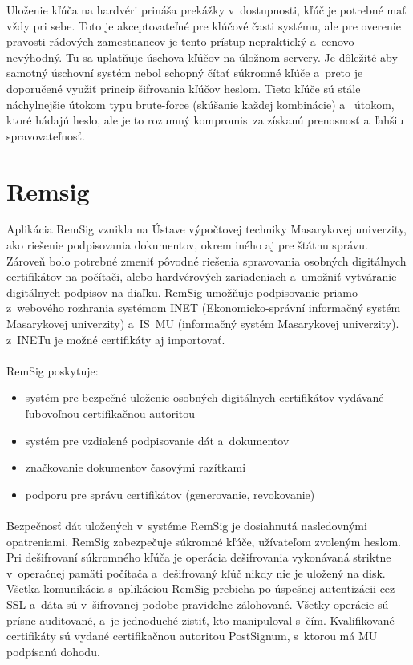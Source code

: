 \documentclass[
  digital, %
  table,   %
oneside,
  nolof,     %
  nolot,     %
]{fithesis3}
\begin{document}
Uloženie kľúča na hardvéri prináša prekážky v~dostupnosti, kľúč je potrebné mať vždy pri sebe. Toto je akceptovateľné pre kľúčové časti systému, ale pre overenie pravosti rádových zamestnancov je tento prístup nepraktický a~cenovo nevýhodný. Tu sa uplatňuje úschova kľúčov na úložnom servery. Je dôležité aby samotný úschovní systém nebol schopný čítať súkromné kľúče a~preto je doporučené využiť princíp šifrovania kľúčov heslom. Tieto kľúče sú stále náchylnejšie útokom typu brute-force (skúšanie každej kombinácie) a~ útokom, ktoré hádajú heslo, ale je to rozumný kompromis~za získanú prenosnosť a~ľahšiu spravovateľnosť.
 
\section{Remsig}
Aplikácia RemSig \cite{remsigMuni} vznikla na Ústave výpočtovej techniky Masarykovej univerzity, ako riešenie podpisovania dokumentov, okrem iného aj pre štátnu správu. Zároveň bolo potrebné zmeniť pôvodné riešenia spravovania osobných digitálnych certifikátov na počítači, alebo hardvérových zariadeniach a~umožniť vytváranie digitálnych podpisov na diaľku. RemSig umožňuje podpisovanie priamo z~webového rozhrania systémom INET (Ekonomicko-správní informačný systém Masarykovej univerzity) a~IS~MU (informačný systém Masarykovej univerzity). z~INETu je možné certifikáty aj importovať.\paragraph{}
RemSig poskytuje:
\begin{itemize}
\item systém pre bezpečné uloženie osobných digitálnych certifikátov vydávané ľubovoľnou certifikačnou autoritou
\item systém pre vzdialené podpisovanie dát a~dokumentov
\item značkovanie dokumentov časovými razítkami 
\item podporu pre správu certifikátov (generovanie, revokovanie)

 \end{itemize}

\paragraph{}
Bezpečnosť dát uložených v~systéme RemSig je dosiahnutá nasledovnými opatreniami. RemSig zabezpečuje súkromné kľúče, užívateľom zvoleným heslom. Pri dešifrovaní súkromného kľúča je operácia dešifrovania vykonávaná striktne v~operačnej pamäti počítača a~dešifrovaný kľúč nikdy nie je uložený na disk. Všetka komunikácia s~aplikáciou RemSig prebieha po úspešnej autentizácii cez SSL a~dáta sú v~šifrovanej podobe pravidelne zálohované. Všetky operácie sú prísne auditované, a~je jednoduché zistiť, kto manipuloval s~čím. Kvalifikované certifikáty sú vydané certifikačnou autoritou PostSignum, s~ktorou má MU podpísanú dohodu.
\end{document}
